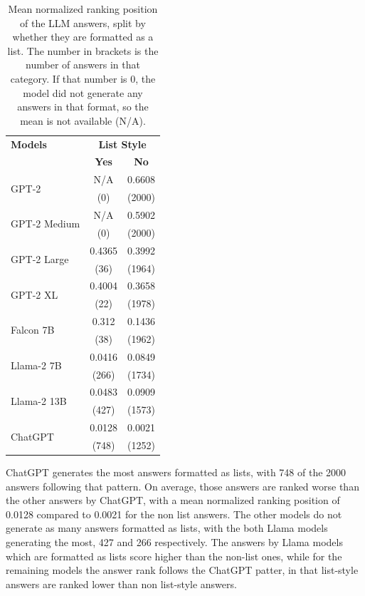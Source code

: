 \begin{table}[tb]
    \centering
    \begin{tabular}{lcc}
    \hline
    \textbf{Models} & \multicolumn{2}{c}{\textbf{List Style}} \\
    \cline{2-3} 
    & \textbf{Yes} & \textbf{No} \\
    \hline
    \multirow{2}{*}{GPT-2}        & N/A           & 0.6608  \\
                                  & (0)           & (2000) \\
    \multirow{2}{*}{GPT-2 Medium} & N/A           & 0.5902  \\
                                  & (0)           & (2000) \\
    \multirow{2}{*}{GPT-2 Large}  & 0.4365        & 0.3992  \\
                                  & (36)          & (1964) \\
    \multirow{2}{*}{GPT-2 XL}     & 0.4004        & 0.3658   \\
                                  & (22)          & (1978)  \\
    \multirow{2}{*}{Falcon 7B}    & 0.312         & 0.1436  \\
                                  & (38)          & (1962) \\
    \multirow{2}{*}{Llama-2 7B}   & 0.0416        & 0.0849  \\
                                  & (266)         & (1734) \\
    \multirow{2}{*}{Llama-2 13B}  & 0.0483        & 0.0909  \\
                                  & (427)         & (1573) \\
    \multirow{2}{*}{ChatGPT}      & 0.0128        & 0.0021  \\
                                  & (748)         & (1252) \\
    \hline
    \end{tabular}
    \caption{Mean normalized ranking position of the LLM answers, split by whether they are formatted as a list. The number in brackets is the number of answers in that category. If that number is 0, the model did not generate any answers in that format, so the mean is not available (N/A).}

    \label{tab:badly_ranked_answers}
\end{table}
ChatGPT generates the most answers formatted as lists, with 748 of the 2000 answers following that pattern.
On average, those answers are ranked worse than the other answers by ChatGPT, with a mean normalized ranking position of 0.0128 compared to 0.0021 for the non list answers.
The other models do not generate as many answers formatted as lists, with the both Llama models generating the most, 427 and 266 respectively.
The answers by Llama models which are formatted as lists score higher than the non-list ones, while for the remaining models the answer rank follows the ChatGPT patter, in that list-style answers are ranked lower than non list-style answers.

